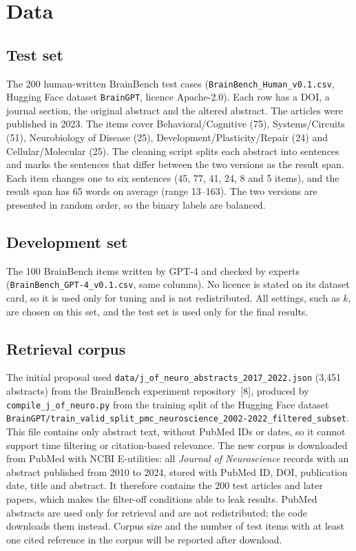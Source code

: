 \documentclass[10pt,a4paper]{article}
\begin{document}
\section{Data}\label{sec:data}
\subsection{Test set}
The 200 human-written BrainBench test cases (\texttt{BrainBench\_Human\_v0.1.csv}, Hugging Face dataset \texttt{BrainGPT}, licence Apache-2.0). Each row has a DOI, a journal section, the original abstract and the altered abstract. The articles were published in 2023. The items cover Behavioral/Cognitive (75), Systems/Circuits (51), Neurobiology of Disease (25), Development/Plasticity/Repair (24) and Cellular/Molecular (25). The cleaning script splits each abstract into sentences and marks the sentences that differ between the two versions as the result span. Each item changes one to six sentences (45, 77, 41, 24, 8 and 5 items), and the result span has 65 words on average (range 13--163). The two versions are presented in random order, so the binary labels are balanced.

\subsection{Development set}
The 100 BrainBench items written by GPT-4 and checked by experts (\texttt{BrainBench\_GPT-4\_v0.1.csv}, same columns). No licence is stated on its dataset card, so it is used only for tuning and is not redistributed. All settings, such as $k$, are chosen on this set, and the test set is used only for the final results.

\subsection{Retrieval corpus}
The initial proposal used \texttt{data/j\_of\_neuro\_abstracts\_2017\_2022.json} (3,451 abstracts) from the BrainBench experiment repository~[8], produced by \texttt{compile\_j\_of\_neuro.py} from the training split of the Hugging Face dataset \texttt{BrainGPT/train\_valid\_split\_pmc\_neuroscience\_2002-2022\_filtered\_subset}. This file contains only abstract text, without PubMed IDs or dates, so it cannot support time filtering or citation-based relevance. The new corpus is downloaded from PubMed with NCBI E-utilities: all \emph{Journal of Neuroscience} records with an abstract published from 2010 to 2024, stored with PubMed ID, DOI, publication date, title and abstract. It therefore contains the 200 test articles and later papers, which makes the filter-off conditions able to leak results. PubMed abstracts are used only for retrieval and are not redistributed; the code downloads them instead. Corpus size and the number of test items with at least one cited reference in the corpus will be reported after download.
\end{document}

